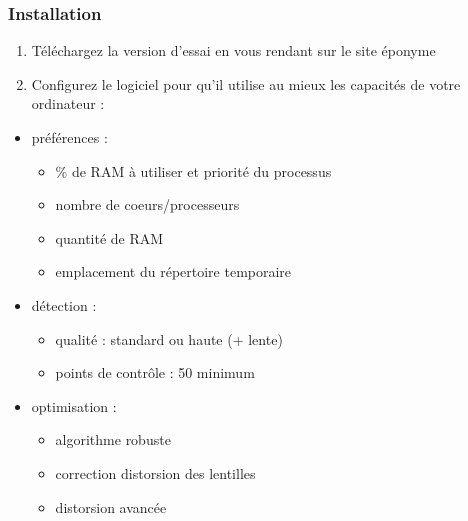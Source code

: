 \documentclass[a4paper,12pt,french]{sphinxmanual}
\begin{document}
\subsubsection{Installation}
\label{psd/scan+assemblage_psd+gimp+autopano:installation}\begin{enumerate}
\item {} 
Téléchargez la version d'essai en vous rendant sur le site éponyme

\item {} 
Configurez le logiciel pour qu'il utilise au mieux les capacités de votre ordinateur :

\end{enumerate}
\begin{itemize}
\item {} 
préférences :
\begin{itemize}
\item {} 
\% de RAM à utiliser et priorité du processus

\item {} 
nombre de coeurs/processeurs

\item {} 
quantité de RAM

\item {} 
emplacement du répertoire temporaire

\end{itemize}

\item {} 
détection :
\begin{itemize}
\item {} 
qualité : standard ou haute (+ lente)

\item {} 
points de contrôle : 50 minimum

\end{itemize}

\item {} 
optimisation :
\begin{itemize}
\item {} 
algorithme  robuste

\item {} 
correction distorsion des lentilles

\item {} 
distorsion avancée

\end{itemize}

\end{itemize}
\end{document}
